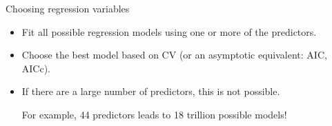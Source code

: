 \documentclass[14pt]{beamer}
\makeatletter
\def\biz{\begin{itemize}[<+-| alert@+>]}
\def\eiz{\end{itemize}}
\makeatother
\begin{document}
\begin{frame}{Choosing regression variables}


\biz
\item
Fit all possible regression models using one or more of the predictors.

\item
Choose the best model based on CV (or an asymptotic equivalent: AIC, AICc).
\eiz

\vfill\pause

\begin{itemize}
\item If there are a large number of predictors, this is not possible.

For example, 44 predictors leads to 18 trillion possible models!
\end{itemize}

\end{frame}



\end{document}
